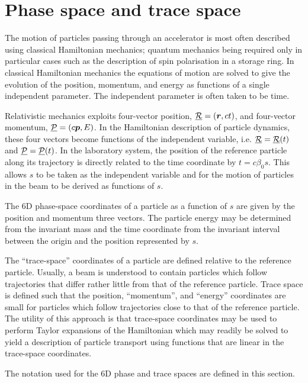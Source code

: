 \graphicspath{ {03-PhaseTraceSpace/Figures/} }

\section{Phase space and trace space}

The motion of particles passing through an accelerator is most often
described using classical Hamiltonian mechanics; quantum mechanics
being required only in particular cases such as the description of
spin polarisation in a storage ring.
In classical Hamiltonian mechanics the equations of motion are solved
to give the evolution of the position, momentum, and energy as
functions of a single independent parameter.
The independent parameter is often taken to be time.

Relativistic mechanics exploits four-vector position,
$\underline{\cal{R}} = (\bm{r}, ct)$, and four-vector momentum,
$\underline{\cal{P}} = (c\bm{p}, E)$.
In the Hamiltonian description of particle dynamics, these four
vectors become functions of the independent variable, i.e.
$\underline{\cal{R}} = \underline{\cal{R}}(t)$ and
$\underline{\cal{P}} = \underline{\cal{P}}(t)$.
In the laboratory system, the position of the reference particle along
its trajectory is directly related to the time coordinate by
$t = c \beta_0 s$.
This allows $s$ to be taken as the independent variable and for the
motion of particles in the beam to be derived as functions of $s$.

The 6D phase-space coordinates of a particle as a function of $s$ are
given by the position and momentum three vectors.
The particle energy may be determined from the invariant mass and the
time coordinate from the invariant interval between the origin and the
position represented by $s$.

The ``trace-space'' coordinates of a particle are defined relative to
the reference particle.
Usually, a beam is understood to contain particles which follow
trajectories that differ rather little from that of the reference
particle.
Trace space is defined such that the position, ``momentum'', and
``energy'' coordinates are small for particles which follow
trajectories close to that of the reference particle.
The utility of this approach is that trace-space coordinates may be
used to perform Taylor expansions of the Hamiltonian which may readily
be solved to yield a description of particle transport using functions
that are linear in the trace-space coordinates.

The notation used for the 6D phase and trace spaces are defined in
this section.

